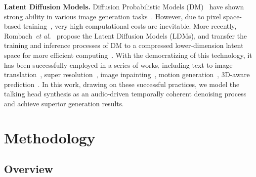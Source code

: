 \documentclass[10pt,twocolumn,letterpaper]{article}
\begin{document}
\textbf{Latent Diffusion Models.}
Diffusion Probabilistic Models (DM)~\cite{sohl2015deep} have shown strong ability in various image generation tasks~\cite{dhariwal2021diffusion,ho2020denoising,ramesh2021zero}. However, due to pixel space-based training~\cite{ronneberger2015u,rombach2022high}, very high computational costs are inevitable. More recently, Rombach~\emph{et al.}~\cite{rombach2022high} propose the Latent Diffusion Models (LDMs), and transfer the training and inference processes of DM to a compressed lower-dimension latent space for more efficient computing~\cite{esser2021taming,zhang2018unreasonable}. With the democratizing of this technology, it has been successfully employed in a series of works, including text-to-image translation~\cite{ruiz2022dreambooth,kawar2022imagic,rombach2022text}, super resolution~\cite{dos2022face,pandey2022diffusevae,chung2022diffusion}, image inpainting~\cite{lugmayr2022repaint,ku2022intelligent}, motion generation~\cite{zhang2022motiondiffuse,shao2022diffustereo}, 3D-aware prediction~\cite{waibel2022diffusion,bautista2022gaudi,saadatnejad2022generic}. In this work, drawing on these successful practices, we model the talking head synthesis as an audio-driven temporally coherent denoising process and achieve superior generation results.



\section{Methodology}


\subsection{Overview}
\label{overview}
\end{document}
